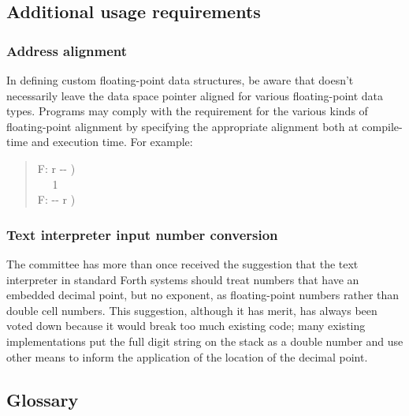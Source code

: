 \setcounter{subsection}{2}
\subsection{Additional usage requirements} %

\setcounter{subsubsection}{4}
\subsubsection{Address alignment} %

In defining custom floating-point data structures, be aware that
 doesn't necessarily leave the data space pointer
aligned for various floating-point data types. Programs may comply
with the requirement for the various kinds of floating-point alignment
by specifying the appropriate alignment both at compile-time and
execution time. For example:

\begin{quote}\ttfamily
	\word{:}   F: r -{}- ) \\
	\tab {}  ~~
		1   ~ \\
	\tab {}  F: -{}- r )
		~  \word{;}
\end{quote}

\setcounter{subsubsection}{6}
\subsubsection{Text interpreter input number conversion} %

The committee has more than once received the suggestion that the
text interpreter in standard Forth systems should treat numbers
that have an embedded decimal point, but no exponent, as
floating-point numbers rather than double cell numbers. This
suggestion, although it has merit, has always been voted down because
it would break too much existing code; many existing implementations
put the full digit string on the stack as a double number and use
other means to inform the application of the location of the decimal
point.

\setcounter{subsection}{5}
\subsection{Glossary} %

